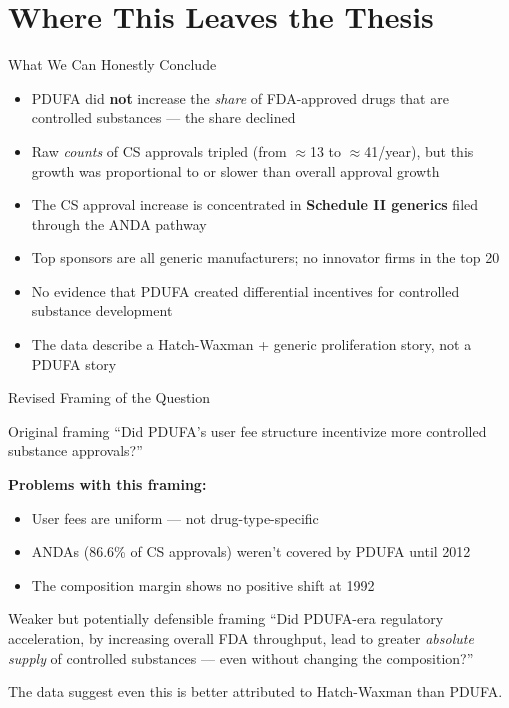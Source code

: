 \documentclass[10pt]{beamer}
\begin{document}
\section{Where This Leaves the Thesis}

\begin{frame}[t]{What We Can Honestly Conclude}
  \begin{itemize}
    \item PDUFA did \textbf{not} increase the \textit{share} of FDA-approved
          drugs that are controlled substances --- the share declined
    \item Raw \textit{counts} of CS approvals tripled (from $\approx$13 to
          $\approx$41/year), but this growth was proportional to or slower
          than overall approval growth
    \item The CS approval increase is concentrated in
          \textbf{Schedule II generics} filed through the ANDA pathway
    \item Top sponsors are all generic manufacturers; no innovator firms in
          the top 20
    \item \alert{No evidence that PDUFA created differential incentives for
          controlled substance development}
    \item The data describe a Hatch-Waxman + generic proliferation story,
          not a PDUFA story
  \end{itemize}
\end{frame}

\begin{frame}[t]{Revised Framing of the Question}
  \begin{block}{Original framing}
    ``Did PDUFA's user fee structure incentivize more controlled substance
    approvals?''
  \end{block}

  \medskip
  \textbf{Problems with this framing:}
  \begin{itemize}
    \item User fees are uniform --- not drug-type-specific
    \item ANDAs (86.6\% of CS approvals) weren't covered by PDUFA until 2012
    \item The composition margin shows no positive shift at 1992
  \end{itemize}

  \medskip
  \begin{block}{Weaker but potentially defensible framing}
    ``Did PDUFA-era regulatory acceleration, by increasing overall FDA
    throughput, lead to greater \textit{absolute supply} of controlled
    substances --- even without changing the composition?''
  \end{block}

  \medskip
  The data suggest even this is better attributed to Hatch-Waxman than PDUFA.
\end{frame}
\end{document}
